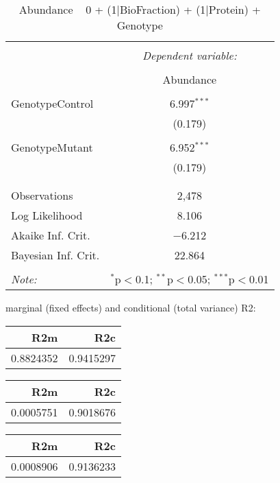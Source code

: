 \documentclass[11pt]{report}
\begin{document}
\begin{table}[!htbp] \centering 
  \caption{Abundance ~ 0 + (1|BioFraction) + (1|Protein) + Genotype} 
  \label{} 
\begin{tabular}{@{\extracolsep{5pt}}lc} 
\\[-1.8ex]\hline 
\hline \\[-1.8ex] 
 & \multicolumn{1}{c}{\textit{Dependent variable:}} \\ 
\cline{2-2} 
\\[-1.8ex] & Abundance \\ 
\hline \\[-1.8ex] 
 GenotypeControl & 6.997$^{***}$ \\ 
  & (0.179) \\ 
  & \\ 
 GenotypeMutant & 6.952$^{***}$ \\ 
  & (0.179) \\ 
  & \\ 
\hline \\[-1.8ex] 
Observations & 2,478 \\ 
Log Likelihood & 8.106 \\ 
Akaike Inf. Crit. & $-$6.212 \\ 
Bayesian Inf. Crit. & 22.864 \\ 
\hline 
\hline \\[-1.8ex] 
\textit{Note:}  & \multicolumn{1}{r}{$^{*}$p$<$0.1; $^{**}$p$<$0.05; $^{***}$p$<$0.01} \\ 
\end{tabular} 
\end{table} 
marginal (fixed effects) and conditional (total variance) R2:

\begin{tabular}{r|r}
\hline
R2m & R2c\\
\hline
0.8824352 & 0.9415297\\
\hline
\end{tabular}

\begin{tabular}{r|r}
\hline
R2m & R2c\\
\hline
0.0005751 & 0.9018676\\
\hline
\end{tabular}

\begin{tabular}{r|r}
\hline
R2m & R2c\\
\hline
0.0008906 & 0.9136233\\
\hline
\end{tabular}
\end{document}
